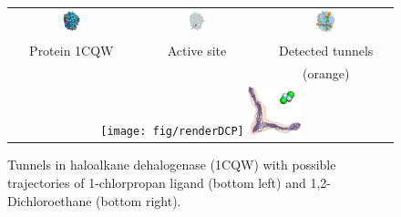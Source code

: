 \documentclass[usletter, 10pt, conference]{ieeeconf} %
\begin{document}
\begin{figure}[t]
\centering
{\footnotesize
\renewcommand{\arraystretch}{0.1}
\renewcommand{\tabcolsep}{0pt}
\begin{tabular}{ccc}
\includegraphics[width=0.15\textwidth]{fig/motiv1} &
\includegraphics[width=0.17\textwidth]{fig/motiv2lab} &
\includegraphics[width=0.16\textwidth]{fig/motiv3}  \\
Protein 1CQW & Active site & Detected tunnels \\ %
             &            & (orange)         \\  %
\multicolumn{3}{c}{%
\texttt{[image: fig/renderDCP]}  \hskip 15pt
\includegraphics[width=0.14\textwidth]{fig/render37t}} \\ 
\end{tabular}
}
\caption{\label{fig::motiv}
    Tunnels in haloalkane dehalogenase (1CQW) with possible trajectories of 1-chlorpropan ligand (bottom left) and 1,2-Dichloroethane (bottom right).
}
\end{figure}
\end{document}
